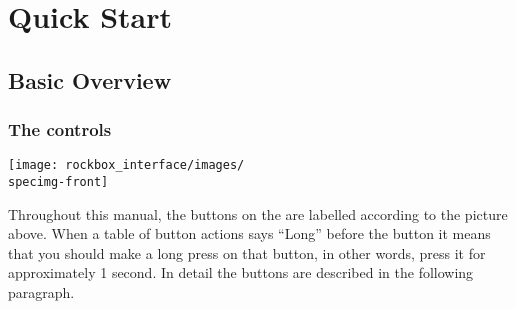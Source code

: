 \chapter{\label{ref:rockbox_interface}Quick Start}
\section{Basic Overview}
\subsection{The \daps{} controls}

\begin{center}
\texttt{[image: rockbox\_interface/images/\\specimg-front]}

\end{center}

Throughout this manual, the buttons on the \dap{} are labelled according to the
picture above. When a table of button actions says ``Long'' before the button it
means that you should make a long press on that button, in other words, press it
for approximately 1 second. In detail the buttons are described in the following
paragraph.


